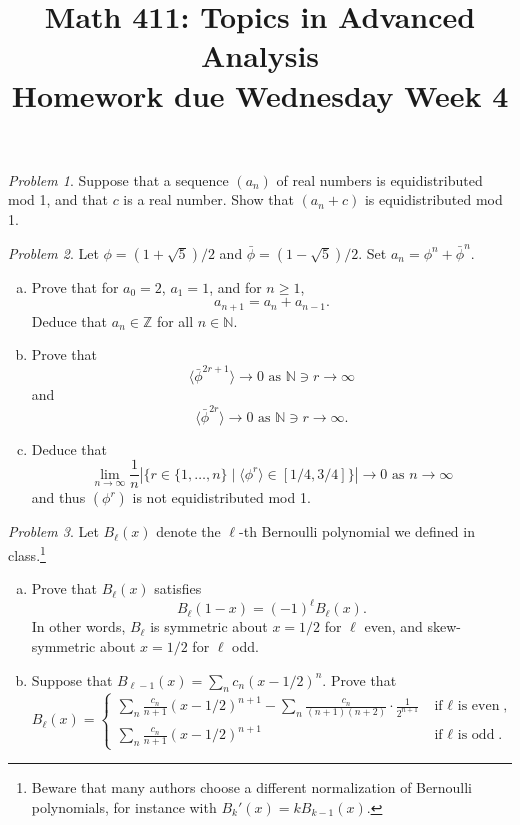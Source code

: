 \documentclass[11pt,twoside]{amsart}
\title{Math 411: Topics in Advanced Analysis\\ Homework due Wednesday Week 4}
\theoremstyle{plain}
\theoremstyle{remark}
\newtheorem{prob}{Problem}
\theoremstyle{definition}
\theoremstyle{definition}
\newcommand{\ZZ}{\mathbb{Z}}
\newcommand{\NN}{\mathbb{N}}
\begin{document}
\maketitle

\begin{prob}
Suppose that a sequence $(a_n)$ of real numbers is equidistributed mod 1, and that $c$ is a real number. Show that $(a_n+c)$ is equidistributed mod 1.
\end{prob}


\begin{prob}
Let $\phi = (1+\sqrt 5)/2$ and $\bar\phi = (1-\sqrt 5)/2$. Set $a_n = \phi^n+\bar\phi^n$.
\begin{enumerate}[(a)]
\item Prove that for $a_0 = 2$, $a_1 = 1$, and for $n\ge 1$,
\[
  a_{n+1} = a_n+a_{n-1}.
\]
Deduce that $a_n\in \ZZ$ for all $n\in \NN$.
\item Prove that
\[
  \langle \bar\phi^{2r+1}\rangle\to 0\text{ as }\NN\ni r\to \infty
\]
and
\[
  \langle \bar\phi^{2r}\rangle\to 0\text{ as }\NN\ni r\to \infty.
\]
\item Deduce that
\[
  \lim_{n\to \infty}\frac{1}{n}\left|\{r\in \{1,\ldots,n\}\mid \langle \phi^r\rangle \in [1/4,3/4]\}\right|\to 0\text{ as }n\to \infty
\]
and thus $(\phi^r)$ is not equidistributed mod 1.
\end{enumerate}
\end{prob}


\begin{prob}
Let $B_\ell(x)$ denote the $\ell$-th Bernoulli polynomial we defined in class.\footnote{Beware that many authors choose a different normalization of Bernoulli polynomials, for instance with $B_k'(x) = kB_{k-1}(x)$.}
\begin{enumerate}[(a)]
\item Prove that $B_\ell(x)$ satisfies
\[
  B_\ell(1-x) = (-1)^\ell B_\ell(x).
\]
In other words, $B_\ell$ is symmetric about $x=1/2$ for $\ell$ even, and skew-symmetric about $x=1/2$ for $\ell$ odd.
\item Suppose that $B_{\ell-1}(x) = \sum_n c_n (x-1/2)^n$. Prove that
\[
  B_\ell(x) =
  \begin{cases}
    \sum_n \frac{c_n}{n+1}(x-1/2)^{n+1} - \sum_n \frac{c_n}{(n+1)(n+2)}\cdot \frac{1}{2^{n+1}}&\text{if $\ell$ is even},\\
    \sum_n \frac{c_n}{n+1}(x-1/2)^{n+1}&\text{if $\ell$ is odd}.
  \end{cases}
\]
\end{enumerate}
\end{prob}
\end{document}
